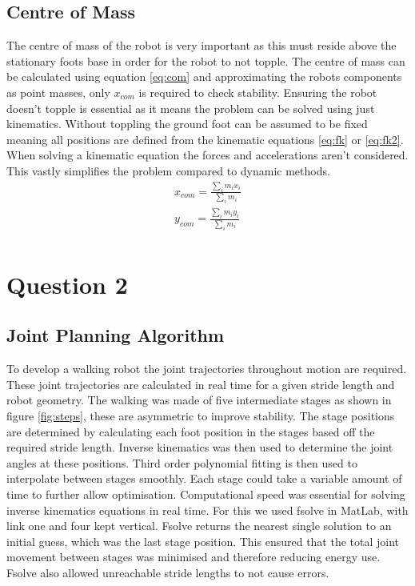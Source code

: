 \documentclass[twoside,twocolumn]{article}
\begin{document}
\subsection{Centre of Mass}
The centre of mass of the robot is very important as this must reside above the stationary foots base in order for the robot to not topple. The centre of mass can be calculated using equation \ref{eq:com} and approximating the robots components as point masses, only $x_{com}$ is required to check stability. Ensuring the robot doesn't topple is essential as it means the problem can be solved using just kinematics. Without toppling the ground foot can be assumed to be fixed meaning all positions are defined from the kinematic equations \ref{eq:fk} or \ref{eq:fk2}. When solving a kinematic equation the forces and accelerations aren't considered. This vastly simplifies the problem compared to dynamic methods. 
\begin{equation}
\begin{split}
x_{com} = \frac{\sum_i m_i x_i}{\sum_i m_i}\\
y_{com} = \frac{\sum_i m_i y_i}{\sum_i m_i}\\
\end{split}
\label{eq:com}
\end{equation} 




\section{Question 2}
\subsection{Joint Planning Algorithm}
To develop a walking robot the joint trajectories throughout motion are required. These joint trajectories are calculated in real time for a given stride length and robot geometry. The walking was made of five intermediate stages as shown in figure \ref{fig:steps}, these are asymmetric to improve stability. The stage positions are determined by calculating each foot position in the stages based off the required stride length. Inverse kinematics was then used to determine the joint angles at these positions. Third order polynomial fitting is then used to interpolate between stages smoothly. Each stage could take a variable amount of time to further allow optimisation.
\newline
Computational speed was essential for solving inverse kinematics equations in real time. For this we used fsolve in MatLab, with link one and four kept vertical. Fsolve returns the nearest single solution to an initial guess, which was the last stage position. This ensured that the total joint movement between stages was minimised and therefore reducing energy use. Fsolve also allowed unreachable stride lengths to not cause errors.
\end{document}
